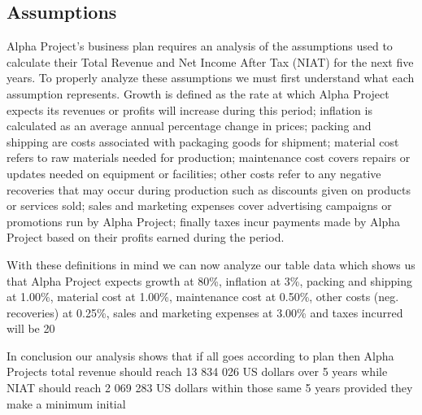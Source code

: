 

\subsection{Assumptions}\label{sec:assumptions}

Alpha Project's business plan requires an analysis of the assumptions used to calculate their Total Revenue and Net Income After Tax (NIAT) for the next five years. To properly analyze these assumptions we must first understand what each assumption represents. Growth is defined as the rate at which Alpha Project expects its revenues or profits will increase during this period; inflation is calculated as an average annual percentage change in prices; packing and shipping are costs associated with packaging goods for shipment; material cost refers to raw materials needed for production; maintenance cost covers repairs or updates needed on equipment or facilities; other costs refer to any negative recoveries that may occur during production such as discounts given on products or services sold; sales and marketing expenses cover advertising campaigns or promotions run by Alpha Project; finally taxes incur payments made by Alpha Project based on their profits earned during the period. 

With these definitions in mind we can now analyze our table data which shows us that Alpha Project expects growth at 80\%, inflation at 3\%, packing and shipping at 1.00\%, material cost at 1.00\%, maintenance cost at 0.50\%, other costs (neg. recoveries) at 0.25\%, sales and marketing expenses at 3.00\% and taxes incurred will be 20%

In conclusion our analysis shows that if all goes according to plan then Alpha Projects total revenue should reach 13 834 026 US dollars over 5 years while NIAT should reach 2 069 283 US dollars within those same 5 years provided they make a minimum initial
